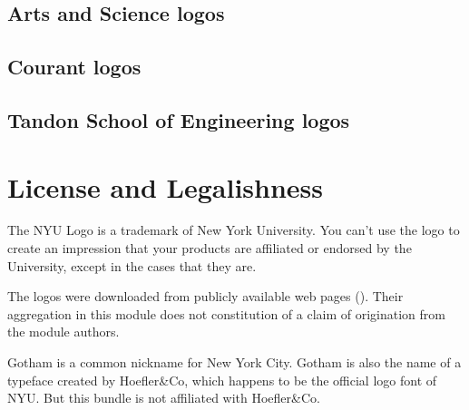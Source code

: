 \documentclass{ltxdoc}
\begin{document}
\subsection{Arts and Science logos}

\subsection{Courant logos}

\subsection{Tandon School of Engineering logos}

\section{License and Legalishness}

The NYU Logo is a trademark of New York University.  You can't use the logo to
create an impression that your products are affiliated or endorsed by the University,
except in the cases that they are.

The logos were downloaded from publicly available web pages (\cite{nyu-downloads}).
Their aggregation in this module does not constitution of a claim of origination
from the module authors.

Gotham is a common nickname for New York City.  Gotham is also the name of a typeface
created by Hoefler\&Co, which happens to be the official logo font of NYU.
But this bundle is not affiliated with Hoefler\&Co.



\end{document}
